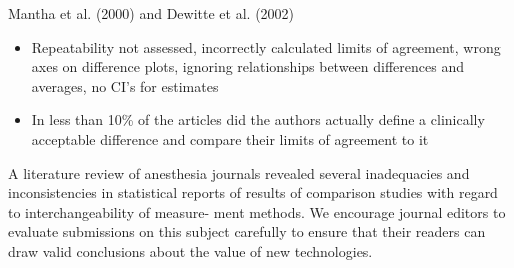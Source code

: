 \documentclass{article}
\begin{document}
\newpage
Mantha et al. (2000) and Dewitte et al. (2002)
\begin{itemize}
\item Repeatability not assessed, incorrectly calculated limits of agreement, wrong axes on difference plots,
ignoring relationships between differences and averages, no CI’s for estimates
\item In less than 10\% of the articles did the authors actually define a clinically acceptable difference and
compare their limits of agreement to it
\end{itemize}



A literature review of anesthesia journals revealed several inadequacies and inconsistencies in statistical reports of results of 
comparison studies with regard to interchangeability of measure- ment methods. We encourage journal editors to 
evaluate submissions on this subject carefully to ensure that their readers can draw valid conclusions about the value of new technologies.
\end{document}
